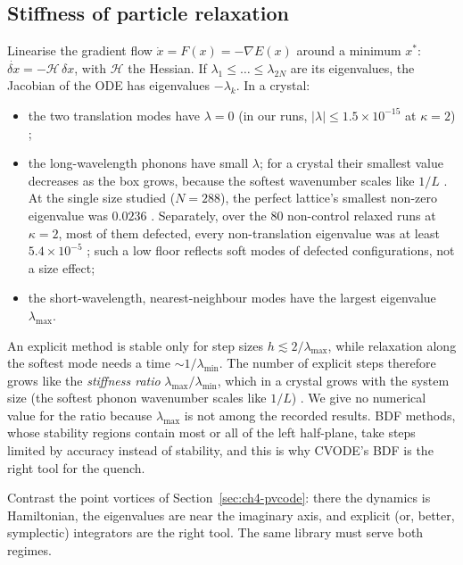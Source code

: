 \subsection{Stiffness of particle relaxation}
Linearise the gradient flow $\dot x = F(x) = -\nabla E(x)$ around a minimum $x^\ast$:
$\dot{\delta x} = -\mathcal H\,\delta x$, with $\mathcal H$ the Hessian. If $\lambda_1\le\dots\le\lambda_{2N}$ are
its eigenvalues, the Jacobian of the ODE has eigenvalues $-\lambda_k$. In a crystal:
\begin{itemize}
\item the two translation modes have $\lambda=0$ (in our runs, $|\lambda|\le1.5\times10^{-15}$ at $\kappa=2$)
\tierX;
\item the long-wavelength phonons have small $\lambda$; for a crystal their smallest value decreases as the box
grows, because the softest wavenumber scales like $1/L$ \tierC. At the single size studied ($N=288$), the perfect
lattice's smallest non-zero eigenvalue was $0.0236$ \tierX. Separately, over the 80 non-control relaxed runs at
$\kappa=2$, most of them defected, every non-translation eigenvalue was at least $5.4\times10^{-5}$ \tierX; such a
low floor reflects soft modes of defected configurations, not a size effect;
\item the short-wavelength, nearest-neighbour modes have the largest eigenvalue $\lambda_{\max}$.
\end{itemize}
An explicit method is stable only for step sizes $h\lesssim 2/\lambda_{\max}$, while relaxation along the softest
mode needs a time $\sim 1/\lambda_{\min}$. The number of explicit steps therefore grows like the
\emph{stiffness ratio} $\lambda_{\max}/\lambda_{\min}$, which in a crystal grows with the system size (the softest
phonon wavenumber scales like $1/L$) \tierC. We give no numerical value for the ratio because $\lambda_{\max}$ is not
among the recorded results. BDF methods, whose stability regions contain most or all of the left half-plane, take
steps limited by accuracy instead of stability, and this is why CVODE's BDF is the right tool for the quench.

Contrast the point vortices of Section~\ref{sec:ch4-pvcode}: there the dynamics is Hamiltonian, the eigenvalues
are near the imaginary axis, and explicit (or, better, symplectic) integrators are the right tool. The same library
must serve both regimes.


